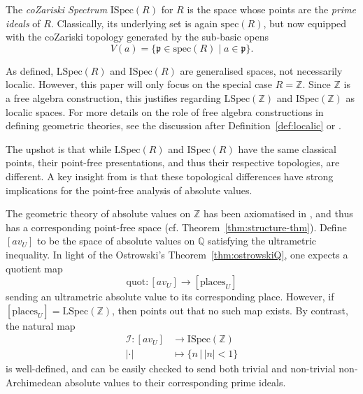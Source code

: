 \documentclass[a4paper, 11pt,reqno]{amsart}
\newcommand{\frap}{\mathfrak{p}}
\newcommand{\ISpec}{\mathrm{ISpec}}
\newcommand{\LSpec}{\mathrm{LSpec}}
\newcommand{\Z}{\mathbb{Z}}
\newcommand{\Q}{\mathbb{Q}}
\newcommand{\spec}{\mathrm{spec}}
\begin{document}
\begin{example}\label{ex:ISpec} The \emph{coZariski Spectrum} $\ISpec(R)$ for $R$ is the space whose points are the \emph{prime ideals} of $R$. Classically, its underlying set is again
	$\spec(R)$, but now equipped with the coZariski topology generated by the sub-basic opens
	\[
	V(a)=\{\frap\in\spec(R)\mid a\in\frap\}.
	\]

\end{example} 

\begin{remark} As defined, $\LSpec(R)$ and $\ISpec(R)$ are generalised spaces, not necessarily localic. However, this paper will only focus on the special case $R=\Z$. Since $\Z$ is a free algebra construction, this justifies regarding $\LSpec(\Z)$ and $\ISpec(\Z)$ as localic spaces. For more details on the role of free algebra constructions in defining geometric theories, see the discussion after Definition~\ref{def:localic} or \cite[\S 3.4]{Vi07}.
\end{remark}


The upshot is that while $\LSpec(R)$ and $\ISpec(R)$ have the same classical points, their
point-free presentations, and thus their respective topologies, are different. A key insight from \cite{NVOstrowski} is that these topological differences have strong implications for the point-free analysis of absolute values.


\begin{discussion}\label{dis:ISpec} The geometric theory of absolute values on $\Z$ has been axiomatised in \cite[\S 2]{NVOstrowski}, and thus has a corresponding point-free space (cf. Theorem~\ref{thm:structure-thm}). Define $[av_U]$ to be the space of absolute values on $\Q$ satisfying the ultrametric inequality. In light of the Ostrowski's Theorem~\ref{thm:ostrowskiQ}, one expects a quotient map
	\begin{equation}
	\mathrm{quot}\colon [av_{U}]\longrightarrow [\mathrm{places}_{U}]
	\end{equation}
	sending an ultrametric absolute value to its corresponding place. However, if $[\mathrm{places}_U]=\LSpec(\Z)$, then \cite[Observation 5.12]{NVOstrowski} points out that no such map exists. By contrast, the natural map
	\begin{align} 
	\mathcal{I}\colon [av_{U}]&\longrightarrow \ISpec(\Z)\\
	|\cdot| &\longmapsto \{n \,\big|\, |n| <1\} \nonumber 
	\end{align}
	is well-defined, and can be easily checked to send both trivial and non-trivial non-Archimedean absolute values to their corresponding prime ideals. 
	
\end{discussion}
\end{document}
